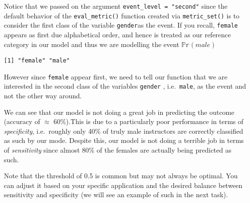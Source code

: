 \documentclass[
  letterpaper,
  DIV=11,
  numbers=noendperiod]{scrartcl}
\newenvironment{Shaded}{\begin{snugshade}}{\end{snugshade}}
\newcommand{\FunctionTok}[1]{\textcolor[rgb]{0.28,0.35,0.67}{#1}}
\newcommand{\NormalTok}[1]{\textcolor[rgb]{0.00,0.23,0.31}{#1}}
\newcommand{\SpecialCharTok}[1]{\textcolor[rgb]{0.37,0.37,0.37}{#1}}
\begin{document}
\begin{tcolorbox}[enhanced jigsaw, colframe=quarto-callout-important-color-frame, toprule=.15mm, toptitle=1mm, opacitybacktitle=0.6, breakable, colback=white, opacityback=0, title=\textcolor{quarto-callout-important-color}{\faExclamation}\hspace{0.5em}{Important}, rightrule=.15mm, bottomrule=.15mm, coltitle=black, colbacktitle=quarto-callout-important-color!10!white, leftrule=.75mm, left=2mm, arc=.35mm, bottomtitle=1mm, titlerule=0mm]

Notice that we passed on the argument \texttt{event\_level\ =\ "second"}
since the default behavior of the \texttt{eval\_metric()} function
created via \texttt{metric\_set()} is to consider the first class of the
variable \texttt{gender}as the event. If you recall, \texttt{female}
appears as first due alphabetical order, and hence is treated as our
reference category in our model and thus we are modelling the event
\(\mathbb{Pr}(male)\)

\begin{Shaded}
\end{Shaded}

\begin{verbatim}
[1] "female" "male"  
\end{verbatim}

However since \texttt{female} appear first, we need to tell our function
that we are interested in the second class of the variables
\texttt{gender} , i.e.~\texttt{male}, as the event and not the other way
around.

\end{tcolorbox}

We can see that our model is not doing a great job in predicting the
outcome (accuracy of \(\approx\) 60\%).This is due to a particularly
poor performance in terms of \emph{specificity}, i.e.~roughly only 40\%
of truly male instructors are correctly classified as such by our mode.
Despite this, our model is not doing a terrible job in terms of
\emph{sensitivity} since almost 80\% of the females are actually being
predicted as such.

Note that the threshold of 0.5 is common but may not always be optimal.
You can adjust it based on your specific application and the desired
balance between sensitivity and specificity (we will see an example of
such in the next task).
\end{document}
